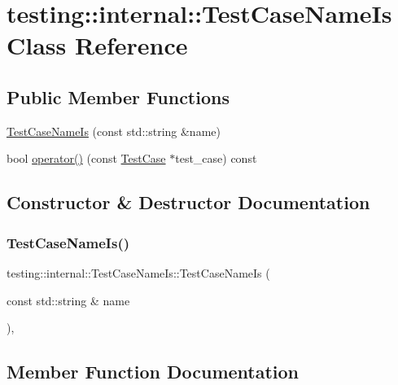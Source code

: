 \hypertarget{classtesting_1_1internal_1_1TestCaseNameIs}{}\section{testing\+::internal\+::Test\+Case\+Name\+Is Class Reference}
\label{classtesting_1_1internal_1_1TestCaseNameIs}
\subsection*{Public Member Functions}
\begin{DoxyCompactItemize}
\item 
\mbox{\hyperlink{classtesting_1_1internal_1_1TestCaseNameIs_a7c983707f4cfe7f36dbabc95da5113c4}{Test\+Case\+Name\+Is}} (const std\+::string \&name)
\item 
bool \mbox{\hyperlink{classtesting_1_1internal_1_1TestCaseNameIs_aa96c4e9facbaa7043c8f0b34465d1eae}{operator()}} (const \mbox{\hyperlink{classtesting_1_1TestCase}{Test\+Case}} $\ast$test\+\_\+case) const
\end{DoxyCompactItemize}


\subsection{Constructor \& Destructor Documentation}
\mbox{\label{classtesting_1_1internal_1_1TestCaseNameIs_a7c983707f4cfe7f36dbabc95da5113c4}} 
\subsubsection{\texorpdfstring{TestCaseNameIs()}{TestCaseNameIs()}}
{\footnotesize\ttfamily testing\+::internal\+::\+Test\+Case\+Name\+Is\+::\+Test\+Case\+Name\+Is (\begin{DoxyParamCaption}\item[{const std\+::string \&}]{name }\end{DoxyParamCaption})\hspace{0.3cm}{\ttfamily [inline]}, {\ttfamily [explicit]}}



\subsection{Member Function Documentation}
\mbox{\label{classtesting_1_1internal_1_1TestCaseNameIs_aa96c4e9facbaa7043c8f0b34465d1eae}} 
